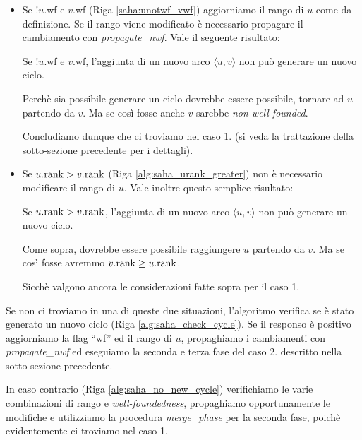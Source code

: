 \begin{itemize}
    \item Se !$u$.wf e $v$.wf (Riga \ref{saha:unotwf_vwf}) aggiorniamo il rango di $u$ come da definizione. Se il rango viene modificato è necessario propagare il cambiamento con \emph{propagate\_nwf}. Vale il seguente risultato:
    \begin{observation}
        Se !$u$.wf e $v$.wf, l'aggiunta di un nuovo arco $\langle u,v \rangle$ non può generare un nuovo ciclo.
    \end{observation}
    \begin{proof2}
        Perchè sia possibile generare un ciclo dovrebbe essere possibile, tornare ad $u$ partendo da $v$. Ma se così fosse anche $v$ sarebbe \emph{non-well-founded}.
    \end{proof2}
    Concludiamo dunque che ci troviamo nel caso 1. (si veda la trattazione della sotto-sezione precedente per i dettagli).
    \item Se $u.\textup{rank} > v.\textup{rank}$ (Riga \ref{alg:saha_urank_greater}) non è necessario modificare il rango di $u$. Vale inoltre questo semplice risultato:
    \begin{observation}
        Se $u.\textup{rank} > v.\textup{rank}$, l'aggiunta di un nuovo arco $\langle u,v \rangle$ non può generare un nuovo ciclo.
    \end{observation}
    \begin{proof2}
        Come sopra, dovrebbe essere possibile raggiungere $u$ partendo da $v$. Ma se così fosse avremmo $v.\textup{rank} \geq u.\textup{rank}$.
    \end{proof2}
    Sicchè valgono ancora le considerazioni fatte sopra per il caso 1.
\end{itemize}
Se non ci troviamo in una di queste due situazioni, l'algoritmo verifica se è stato generato un nuovo ciclo (Riga \ref{alg:saha_check_cycle}). Se il responso è positivo aggiorniamo la flag ``wf'' ed il rango di $u$, propaghiamo i cambiamenti con \emph{propagate\_nwf} ed eseguiamo la seconda e terza fase del caso 2. descritto nella sotto-sezione precedente.

In caso contrario (Riga \ref{alg:saha_no_new_cycle}) verifichiamo le varie combinazioni di rango e \emph{well-foundedness}, propaghiamo opportunamente le modifiche e utilizziamo la procedura \emph{merge\_phase} per la seconda fase, poichè evidentemente ci troviamo nel caso 1.

